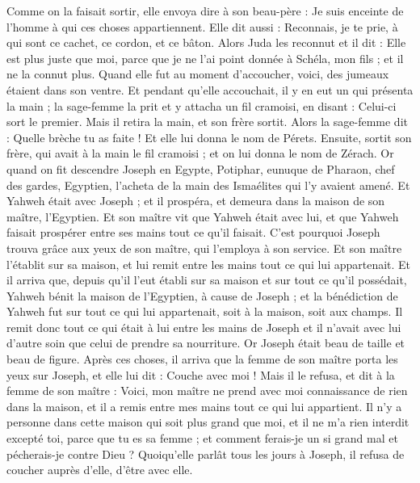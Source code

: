 \begin{multicols}{2}
Comme on la faisait sortir, elle envoya dire à son beau-père : Je suis enceinte de l'homme à qui ces choses appartiennent. Elle dit aussi : Reconnais, je te prie, à qui sont ce cachet, ce cordon, et ce bâton.
Alors Juda les reconnut et il dit : Elle est plus juste que moi, parce que je ne l'ai point donnée à Schéla, mon fils ; et il ne la connut plus.
Quand elle fut au moment d'accoucher, voici, des jumeaux étaient dans son ventre.
Et pendant qu'elle accouchait, il y en eut un qui présenta la main ; la sage-femme la prit et y attacha un fil cramoisi, en disant : Celui-ci sort le premier.
Mais il retira la main, et son frère sortit. Alors la sage-femme dit : Quelle brèche tu as faite ! Et elle lui donna le nom de Pérets.
Ensuite, sortit son frère, qui avait à la main le fil cramoisi ; et on lui donna le nom de Zérach.
\VerseOne{}Or quand on fit descendre Joseph en Egypte, Potiphar, eunuque de Pharaon, chef des gardes, Egyptien, l'acheta de la main des Ismaélites qui l'y avaient amené.
Et Yahweh était avec Joseph ; et il prospéra, et demeura dans la maison de son maître, l'Egyptien.
Et son maître vit que Yahweh était avec lui, et que Yahweh faisait prospérer entre ses mains tout ce qu'il faisait.
C'est pourquoi Joseph trouva grâce aux yeux de son maître, qui l'employa à son service. Et son maître l'établit sur sa maison, et lui remit entre les mains tout ce qui lui appartenait.
Et il arriva que, depuis qu'il l'eut établi sur sa maison et sur tout ce qu'il possédait, Yahweh bénit la maison de l'Egyptien, à cause de Joseph ; et la bénédiction de Yahweh fut sur tout ce qui lui appartenait, soit à la maison, soit aux champs.
Il remit donc tout ce qui était à lui entre les mains de Joseph et il n'avait avec lui d'autre soin que celui de prendre sa nourriture. Or Joseph était beau de taille et beau de figure.
Après ces choses, il arriva que la femme de son maître porta les yeux sur Joseph, et elle lui dit : Couche avec moi !
Mais il le refusa, et dit à la femme de son maître : Voici, mon maître ne prend avec moi connaissance de rien dans la maison, et il a remis entre mes mains tout ce qui lui appartient.
Il n'y a personne dans cette maison qui soit plus grand que moi, et il ne m'a rien interdit excepté toi, parce que tu es sa femme ; et comment ferais-je un si grand mal et pécherais-je contre Dieu ?
Quoiqu'elle parlât tous les jours à Joseph, il refusa de coucher auprès d'elle, d'être avec elle.

\end{multicols}
